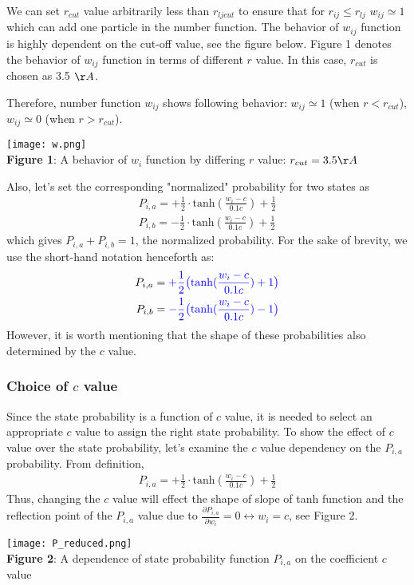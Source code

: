 \documentclass[11pt, oneside]{article}   	%
\begin{document}
We can set $r_{cut}$ value arbitrarily less than $r_{lj cut}$ to ensure that for $r_{ij} \leq r_{lj}$ $w_{ij}  \simeq 1$ which can add one particle in the number function. The behavior of $w_{ij}$ function is highly dependent on the cut-off value, see the figure below. Figure 1 denotes the behavior of $w_{ij}$ function in terms of different $r$ value. In this case, $r_{cut}$ is chosen as 3.5 $\AA$. 

Therefore, number function $w_{ij}$ shows following behavior: $w_{ij} \simeq 1$ (when $r < r_{cut}$), $w_{ij} \simeq 0$ (when $r > r_{cut}$). 
\begin{center}
\texttt{[image: w.png]} \\
\textbf{Figure 1}: A behavior of $w_i$ function by differing $r$ value: $r_{cut}=3.5 \AA$
\end{center}

Also, let's set the corresponding "normalized" probability for two states as 
\begin{align*}
P_{i,a} = + \frac{1}{2} \cdot \textrm{tanh}(\frac{w_i - c}{0.1c}) + \frac{1}{2} \\
P_{i,b} = - \frac{1}{2} \cdot \textrm{tanh}(\frac{w_i - c}{0.1c}) + \frac{1}{2}
\end{align*}
which gives $P_{i,a}+P_{i,b} = 1$, the normalized probability. For the sake of brevity, we use the short-hand notation henceforth as:
\begin{align*}
P_{i,a} = \color{blue}{+ \frac{1}{2}\bigl(  \textrm{tanh}(\frac{w_i - c}{0.1c}) + 1 \bigr) }\\
P_{i,b} = \color{blue}{- \frac{1}{2} \bigl( \textrm{tanh}(\frac{w_i - c}{0.1c}) -1 \bigr)}
\end{align*}
However, it is worth mentioning that the shape of these probabilities also determined by the $c$ value.
\subsubsection{Choice of $c$ value}
Since the state probability is a function of $c$ value, it is needed to select an appropriate $c$ value to assign the right state probability. To show the effect of $c$ value over the state probability, let's examine the $c$ value dependency on the $P_{i,a}$ probability. From definition,
\begin{align*}
P_{i,a} = +\frac{1}{2} \cdot \textrm{tanh}(\frac{w_i -c}{0.1c}) + \frac{1}{2}
\end{align*}
Thus, changing the $c$ value will effect the shape of slope of tanh function and the reflection point of the $P_{i,a}$ value due to $\frac{\partial P_{i,a}}{\partial w_i} = 0 \leftrightarrow w_i = c$, see Figure 2.
\begin{center}
\texttt{[image: P\_reduced.png]} \\
\textbf{Figure 2}: A dependence of state probability function $P_{i,a}$ on the coefficient $c$ value
\end{center}
\end{document}
